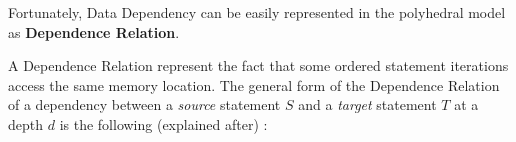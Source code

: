 \documentclass[paper=a4, fontsize=11.5pt]{scrartcl}
\numberwithin{equation}{section}        %
\numberwithin{figure}{section}          %
\numberwithin{table}{section}               %
\begin{document}
        Fortunately, Data Dependency can be easily represented in the polyhedral model as
        \textbf{Dependence Relation}.

        A Dependence Relation represent the fact that some ordered statement iterations
        access the same memory location. The general form of the Dependence Relation of
        a dependency between a \textit{source} statement $S$ and a \textit{target}
        statement $T$ at a depth $d$ is the following (explained after) :

        \begin{center}
\end{center}
\end{document}
